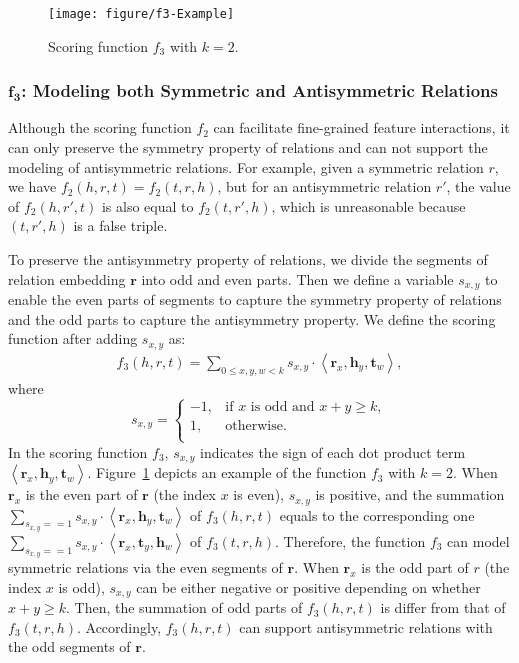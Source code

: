 \documentclass[11pt,a4paper]{article}
\newcommand{\SegVec}[1]{\mathbf{#1}}
\begin{document}
\begin{figure}[!h]
	\centering
	\texttt{[image: figure/f3-Example]}
	\caption{Scoring function $f_3$ with $k=2$.}
	\label{fig:f3_example}
\end{figure}
\subsubsection{$\bm{f_3}$: Modeling both Symmetric and Antisymmetric Relations}
Although the scoring function $f_2$ can facilitate fine-grained feature interactions, it can only preserve the symmetry property of relations and can not support the modeling of antisymmetric relations.
For example, given a symmetric relation $r$, we have $f_2(h, r, t) = f_2(t, r, h)$, but for an antisymmetric relation $r'$, the value of $f_2(h, r', t)$ is also equal to $f_2(t, r', h)$, which is unreasonable because $(t, r', h)$ is a false triple.

To preserve the antisymmetry property of relations, we divide the segments of relation embedding $\SegVec{r}$ into odd and even parts. Then we define a variable $s_{x, y}$ to enable the even parts of segments to capture the symmetry property of relations and the odd parts to capture the antisymmetry property. We define the scoring function after adding $s_{x, y}$ as:
\begin{align}
f_3(h, r, t) = \sum_{0 \leq x, y, w < k} s_{x, y} \cdot \left< \SegVec{r}_x, \SegVec{h}_y, \SegVec{t}_w \right>,
\label{eq:anti-score-function}
\end{align}
where
\[
s_{x, y} = 
\left\{
\begin{array}{cl}
-1, & \text{if } x \text{ is odd and } x + y \geq k, \\
1,  & \text{otherwise}. \\
\end{array}
\right.
\]
In the scoring function $f_3$, $s_{x, y}$ indicates the sign of each dot product term $\left< \SegVec{r}_x, \SegVec{h}_y, \SegVec{t}_w \right>$. 
Figure~\ref{fig:f3_example} depicts an example of the function $f_3$ with $k=2$.
When $\SegVec{r}_x$ is the even part of $\SegVec{r}$ (the index $x$ is even), $s_{x, y}$ is positive, and the summation $\sum_{s_{x, y} == 1} s_{x, y} \cdot \left< \SegVec{r}_x, \SegVec{h}_y, \SegVec{t}_w \right>$ of $f_3(h, r, t)$ equals to the corresponding one $\sum_{s_{x, y} == 1} s_{x, y} \cdot \left< \SegVec{r}_x, \SegVec{t}_y, \SegVec{h}_w \right>$ of $f_3(t, r, h)$.
Therefore, the function $f_3$ can model symmetric relations via the even segments of $\SegVec{r}$.
When $\SegVec{r}_x$ is the odd part of $r$ (the index $x$ is odd), $s_{x, y}$ can be either negative or positive depending on whether $x + y \geq k$.
Then, the summation of odd parts of $f_3(h, r, t)$ is differ from that of $f_3(t, r, h)$.
Accordingly, $f_3(h, r, t)$ can support antisymmetric relations with the odd segments of $\SegVec{r}$. 
\end{document}
